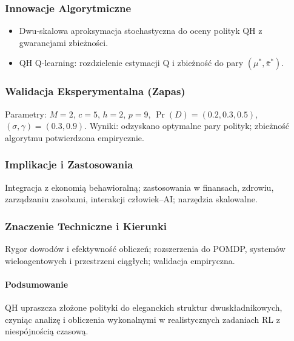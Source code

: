 \subsubsection*{Innowacje Algorytmiczne}
\begin{itemize}
  \item Dwu-skalowa aproksymacja stochastyczna do oceny polityk QH z gwarancjami zbieżności.
  \item QH Q-learning: rozdzielenie estymacji Q i zbieżność do pary $(\mu^*,\bar{\pi}^*)$.
\end{itemize}

\subsubsection*{Walidacja Eksperymentalna (Zapas)}
Parametry: $M{=}2$, $c{=}5$, $h{=}2$, $p{=}9$, $\Pr(D)=(0.2,0.3,0.5)$, $(\sigma,\gamma)=(0.3,0.9)$. Wyniki: odzyskano optymalne pary polityk; zbieżność algorytmu potwierdzona empirycznie.

\subsubsection*{Implikacje i Zastosowania}
Integracja z ekonomią behawioralną; zastosowania w finansach, zdrowiu, zarządzaniu zasobami, interakcji człowiek–AI; narzędzia skalowalne.

\subsubsection*{Znaczenie Techniczne i Kierunki}
Rygor dowodów i efektywność obliczeń; rozszerzenia do POMDP, systemów wieloagentowych i przestrzeni ciągłych; walidacja empiryczna.

\paragraph{Podsumowanie}
QH upraszcza złożone polityki do eleganckich struktur dwuskładnikowych, czyniąc analizę i obliczenia wykonalnymi w realistycznych zadaniach RL z niespójnością czasową.
